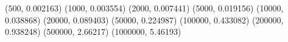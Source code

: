 (500, 0.002163) (1000, 0.003554) (2000, 0.007441) (5000, 0.019156) (10000, 0.038868) (20000, 0.089403) (50000, 0.224987) (100000, 0.433082) (200000, 0.938248) (500000, 2.66217) (1000000, 5.46193) 